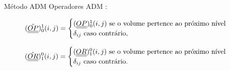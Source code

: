 \documentclass[professionalfont]{beamer}
\begin{document}
\begin{frame}{Método ADM}
    \small
    Operadores ADM \cite{Cusini2016}:

    \begin{equation}
        \label{eq:multinivel.1}
    (\hat{\underline{\underline{OP}}})^{1}_{0} (i,j) =
        \begin{cases}
            (\underline{\underline{OP}})^{1}_{0} (i,j) \text{ se o volume pertence ao próximo nível}\\
            \delta_{ij} \text{ caso contrário},\\
        \end{cases}
    \end{equation}

    \begin{equation}
        \label{eq:multinivel.2}
    (\hat{\underline{\underline{OR}}})^{0}_{1} (i,j) =
        \begin{cases}
            (\underline{\underline{OR}})^{0}_{1} (i,j) \text{ se o volume pertence ao próximo nível}\\
            \delta_{ij} \text{ caso contrário}.\\
        \end{cases}
    \end{equation}

\end{frame}

\end{document}
